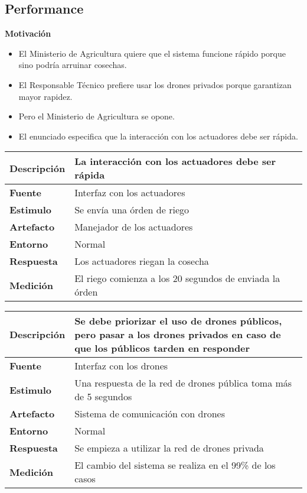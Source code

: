 \subsection{Performance}
\textbf{Motivación}
\begin{itemize}
 \item El Ministerio de Agricultura quiere que el sistema funcione rápido porque sino podría arruinar cosechas.
 \item El Responsable Técnico prefiere usar los drones privados porque garantizan mayor rapidez.
 \item Pero el Ministerio de Agricultura se opone.
 \item El enunciado especifica que la interacción con los actuadores debe ser rápida.
\end{itemize}

\begin{tabular}{| l || p{12cm} |}
\hline 
\textbf{Descripci\'on} & La interacción con los actuadores debe ser rápida \\
\hline 
\textbf{Fuente} & Interfaz con los actuadores \\
\hline 
\textbf{Estimulo} & Se envía una órden de riego \\
\hline 
\textbf{Artefacto} & Manejador de los actuadores \\
\hline 
\textbf{Entorno} & Normal \\
\hline 
\textbf{Respuesta} & Los actuadores riegan la cosecha \\
\hline 
\textbf{Medici\'on} & El riego comienza a los 20 segundos de enviada la órden \\
\hline 
\end{tabular}

\medskip

\begin{tabular}{| l || p{12cm} |}
\hline 
\textbf{Descripci\'on} & Se debe priorizar el uso de drones públicos, pero pasar a los drones privados en caso de que los públicos tarden en responder \\
\hline 
\textbf{Fuente} & Interfaz con los drones \\
\hline 
\textbf{Estimulo} & Una respuesta de la red de drones pública toma más de 5 segundos \\
\hline 
\textbf{Artefacto} & Sistema de comunicación con drones \\
\hline 
\textbf{Entorno} & Normal \\
\hline 
\textbf{Respuesta} & Se empieza a utilizar la red de drones privada \\
\hline 
\textbf{Medici\'on} & El cambio del sistema se realiza en el 99\% de los casos \\
\hline 
\end{tabular}


